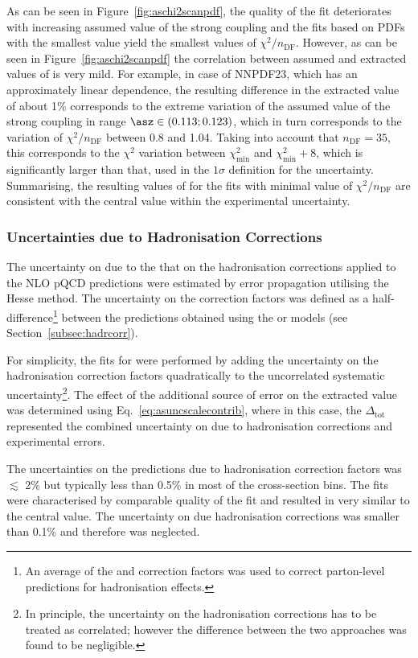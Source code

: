 As can be seen in Figure~\ref{fig:aschi2scanpdf}, the quality of the fit deteriorates with increasing assumed value of the strong coupling and the fits based on PDFs with the smallest \asz value yield the smallest values of $\chi^2/n_\text{DF}$. However, as can be seen in Figure~\ref{fig:aschi2scanpdf} the correlation between assumed and extracted values of \asz is very mild. For example, in case of NNPDF23, which has an approximately linear dependence, the resulting difference in the extracted \asz value of about 1\% corresponds to the extreme variation of the assumed value of the strong coupling in range $\asz \in \left(0.113;0.123\right)$, which in turn corresponds to the variation of $\chi^2/n_\text{DF}$ between 0.8 and 1.04. Taking into account that $n_\text{DF}=35$, this corresponds to the $\chi^2$ variation between $\chi^2_\mathrm{min}$ and $\chi^2_\mathrm{min}+8$, which is significantly larger than that, used in the $1\sigma$ definition for the \asz uncertainty. Summarising, the resulting values of \as for the fits with minimal value of $\chi^2/n_\text{DF}$ are consistent with the central value within the experimental uncertainty.

\subsubsection{Uncertainties due to Hadronisation Corrections}
\label{subsec:ashadrunc}
The uncertainty on \as due to the that on the hadronisation corrections applied to the NLO pQCD predictions were estimated by error propagation utilising the Hesse method. The uncertainty on the correction factors was defined as a half-difference\footnote{An average of the \lepto and \ariadne correction factors was used to correct parton-level predictions for hadronisation effects.} between the predictions obtained using the \ariadne or \lepto models (see Section~\ref{subsec:hadrcorr}).

For simplicity, the fits for \as were performed by adding the uncertainty on the hadronisation correction factors quadratically to the uncorrelated systematic uncertainty\footnote{In principle, the uncertainty on the hadronisation corrections has to be treated as correlated; however the difference between the two approaches was found to be negligible.}. The effect of the additional source of error on the extracted \asz value was determined using Eq.~\eqref{eq:asuncscalecontrib}, where in this case, the $\Delta_\text{tot}$ represented the combined uncertainty on \as due to hadronisation corrections and experimental errors.

The uncertainties on the predictions due to hadronisation correction factors was $\lesssim$ 2\% but typically less than 0.5\% in most of the cross-section bins. The \as fits were characterised by comparable quality of the fit and resulted in \asz very similar to the central value. The uncertainty on \asz due hadronisation corrections was smaller than 0.1\% and therefore was neglected.